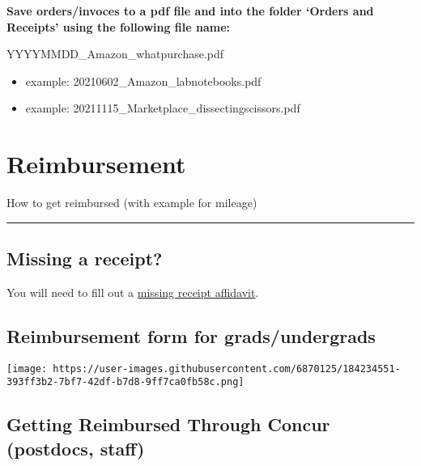 \documentclass[
  letterpaper,
  DIV=11,
  numbers=noendperiod]{scrreprt}
\begin{document}
\textbf{Save orders/invoces to a pdf file and into the folder `Orders
and Receipts' using the following file name:}

YYYYMMDD\_Amazon\_whatpurchase.pdf

\begin{itemize}
\item
  example: 20210602\_Amazon\_labnotebooks.pdf
\item
  example: 20211115\_Marketplace\_dissectingscissors.pdf
\end{itemize}

\hypertarget{reimbursement}{%
\chapter{Reimbursement}\label{reimbursement}}

How to get reimbursed (with example for mileage)

\begin{center}\rule{0.5\linewidth}{0.5pt}\end{center}

\hypertarget{missing-a-receipt}{%
\section*{\texorpdfstring{\textbf{Missing a
receipt?}}{Missing a receipt?}}\label{missing-a-receipt}}


You will need to fill out a
\href{https://drive.google.com/open?id=15O6iVj2p2Qf_em6hiHeyg3co1UQEIbzU\&authuser=k.lotterhos\%40gmail.com\&usp=drive_fs}{missing
receipt affidavit}.

\hypertarget{reimbursement-form-for-gradsundergrads}{%
\section*{\texorpdfstring{\textbf{Reimbursement form for
grads/undergrads}}{Reimbursement form for grads/undergrads}}\label{reimbursement-form-for-gradsundergrads}}


\texttt{[image: https://user-images.githubusercontent.com/6870125/184234551-393ff3b2-7bf7-42df-b7d8-9ff7ca0fb58c.png]}

\hypertarget{getting-reimbursed-through-concur-postdocs-staff}{%
\section*{\texorpdfstring{\textbf{Getting Reimbursed Through Concur
(postdocs,
staff)}}{Getting Reimbursed Through Concur (postdocs, staff)}}\label{getting-reimbursed-through-concur-postdocs-staff}}
\end{document}
